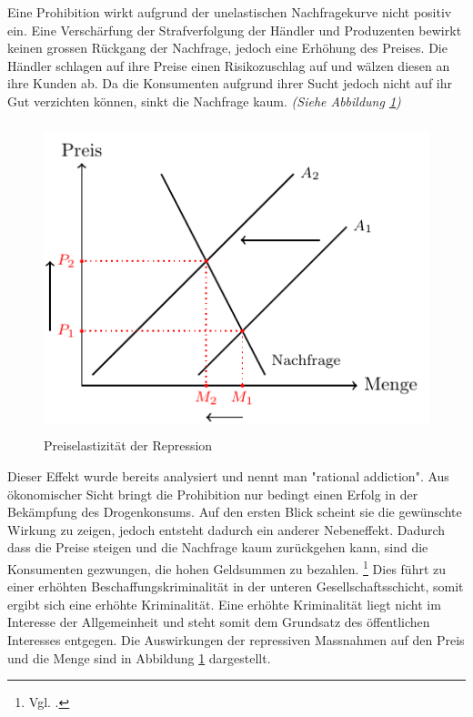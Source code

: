 \documentclass[../main.tex]{subfiles}
\begin{document}
	\noindent
	Eine Prohibition wirkt aufgrund der unelastischen Nachfragekurve nicht positiv ein.
	Eine Verschärfung der Strafverfolgung der Händler und Produzenten bewirkt keinen grossen Rückgang der Nachfrage, jedoch eine Erhöhung des Preises.
	Die Händler schlagen auf ihre Preise einen Risikozuschlag auf und wälzen diesen an ihre Kunden ab.
	Da die Konsumenten aufgrund ihrer Sucht jedoch nicht auf ihr Gut verzichten können, sinkt die Nachfrage kaum.
	\textit{(Siehe Abbildung \ref{fig:repression})}\\
	
	\noindent
	\begin{figure}[H]
		\centering
		\includegraphics[height=9cm]{../figures/priceelasticity-repression}
		\captionsetup{font=small}
		\caption[Preiselastizität der Repression]{Preiselastizität der Repression\protect\footnotemark}		
		\label{fig:repression}
	\end{figure}
	
	\noindent
	Dieser Effekt wurde bereits analysiert und nennt man "rational addiction".
	Aus ökonomischer Sicht bringt die Prohibition nur bedingt einen Erfolg in der Bekämpfung des Drogenkonsums. 
	Auf den ersten Blick scheint sie die gewünschte Wirkung zu zeigen, jedoch entsteht dadurch ein anderer Nebeneffekt. 
	Dadurch dass die Preise steigen und die Nachfrage kaum zurückgehen kann, sind die Konsumenten gezwungen, die hohen Geldsummen zu bezahlen.%
	\footnote{Vgl. \cite{becker}.}
	Dies führt zu einer erhöhten Beschaffungskriminalität in der unteren Gesellschaftsschicht, somit ergibt sich eine erhöhte Kriminalität. 
	Eine erhöhte Kriminalität liegt nicht im Interesse der Allgemeinheit und steht somit dem Grundsatz des öffentlichen Interesses entgegen.
	Die Auswirkungen der repressiven Massnahmen auf den Preis und die Menge sind in Abbildung \ref{fig:repression} dargestellt.
	
\end{document}
